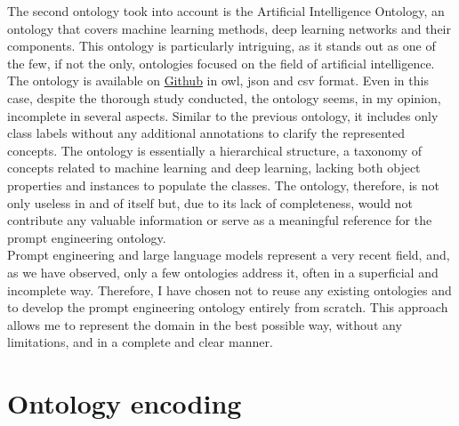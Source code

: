 The second ontology took into account is the Artificial Intelligence Ontology\cite{aio}, an ontology that covers machine learning methods, deep learning networks and their components. This ontology is particularly intriguing, as it stands out as one of the few, if not the only, ontologies focused on the field of artificial intelligence. The ontology is available on \href{https://github.com/berkeleybop/artificial-intelligence-ontology}{Github} in owl, json and csv format. Even in this case, despite the thorough study conducted, the ontology seems, in my opinion, incomplete in several aspects. Similar to the previous ontology, it includes only class labels without any additional annotations to clarify the represented concepts. The ontology is essentially a hierarchical structure, a taxonomy of concepts related to machine learning and deep learning, lacking both object properties and instances to populate the classes. The ontology, therefore, is not only useless in and of itself but, due to its lack of completeness, would not contribute any valuable information or serve as a meaningful reference for the prompt engineering ontology.\\ Prompt engineering and large language models represent a very recent field, and, as we have observed, only a few ontologies address it, often in a superficial and incomplete way. Therefore, I have chosen not to reuse any existing ontologies and to develop the prompt engineering ontology entirely from scratch. This approach allows me to represent the domain in the best possible way, without any limitations, and in a complete and clear manner.

\newpage
\section{Ontology encoding}

